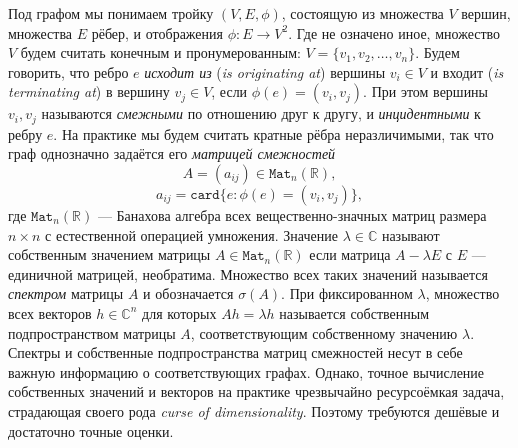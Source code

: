 \documentclass[14pt,a4paper]{extarticle}
\theoremstyle{definition}
\begin{document}
Под графом мы понимаем тройку \((V, E, \phi)\), состоящую
из множества \( V \) вершин, множества \( E \) рёбер,
и отображения \( \phi: E\to V^2\). Где не означено иное,
множество \( V \) будем считать конечным и пронумерованным: \( V = \{ v_1, v_2,
\ldots, v_n \}\). 
Будем говорить, что ребро \( e \) \emph{исходит из} (\emph{is originating at})
вершины \( v_i\in V \)
и входит (\emph{is terminating at}) в вершину \( v_j\in V \),
если \( \phi(e)=(v_i, v_j)\). При этом вершины \( v_i, v_j \) называются
\emph{смежными} по отношению друг к другу, и \emph{инцидентными} к ребру \( e \).
На практике мы будем считать кратные рёбра неразличимыми,
так что граф однозначно задаётся его \emph{матрицей смежностей}
\[ A = ( a_{ij} ) \in \mathtt{Mat}_n(\mathbb{R}), \]
\[ a_{ij} = \mathtt{card}\{ e: \phi(e)=(v_i, v_j)\}, \]
где \( \mathtt{Mat}_n(\mathbb{R}) \) --- Банахова алгебра всех
вещественно-значных матриц размера
\( n{\times}n \) с естественной операцией умножения.
Значение \( \lambda \in \mathbb{C} \) называют собственным значением
матрицы \(
A\in\mathtt{Mat}_n(\mathbb{R}) \) если матрица \( A - \lambda E \) с \( E \) --- единичной
матрицей, необратима. Множество всех таких значений называется
\emph{спектром} матрицы \( A \) и обозначается \( \sigma(A) \).
При фиксированном \( \lambda \),  множество всех векторов \( h\in\mathbb{C}^n \)
для которых \( A h = \lambda h \) называется собственным подпространством матрицы
\( A \), соответствующим собственному значению \( \lambda \).
Спектры и собственные подпространства матриц смежностей несут в себе важную
информацию о соответствующих графах. Однако, точное вы\-числ\-ение собств\-енных
значений и век\-торов на практике чрез\-вычайно ресурсо\-ёмкая задача, страдающая
своего рода \emph{curse of dimensionality}. Поэтому требуются дешёвые и
дос\-таточно точные оценки.
\end{document}
